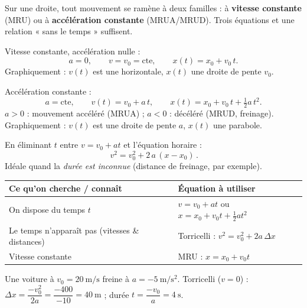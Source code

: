 \documentclass[11pt,a4paper]{article}
\begin{document}

\noindent Sur une droite, tout mouvement se ramène à deux familles : à \textbf{vitesse constante}
(MRU) ou à \textbf{accélération constante} (MRUA/MRUD). Trois équations et une relation « sans le temps » suffisent.

\begin{cle}
Vitesse constante, accélération nulle :
\[ a=0,\qquad v=v_0=\text{cte},\qquad x(t)=x_0+v_0\,t. \]
Graphiquement : $v(t)$ est une horizontale, $x(t)$ une droite de pente $v_0$.
\end{cle}

\begin{cle}
Accélération constante :
\[ a=\text{cte},\qquad v(t)=v_0+a\,t,\qquad x(t)=x_0+v_0\,t+\tfrac12 a\,t^2. \]
$a>0$ : mouvement accéléré (MRUA) ; $a<0$ : décéléré (MRUD, freinage).
Graphiquement : $v(t)$ est une droite de pente $a$, $x(t)$ une parabole.
\end{cle}

\begin{cle}
En éliminant $t$ entre $v=v_0+at$ et l'équation horaire :
\[ \boxed{\,v^2=v_0^2+2\,a\,(x-x_0)\,}. \]
Idéale quand la \emph{durée est inconnue} (distance de freinage, par exemple).
\end{cle}

\begin{methode}
\begin{center}\small
\begin{tabular}{@{}>{\raggedright\arraybackslash}p{5.4cm}|>{\raggedright\arraybackslash}p{8.6cm}@{}}
\toprule
\rowcolor{primary!12}\textbf{Ce qu'on cherche / connaît} & \textbf{Équation à utiliser} \\
\midrule
On dispose du temps $t$ & $v=v_0+at$ \quad ou \quad $x=x_0+v_0t+\tfrac12at^2$ \\
Le temps n'apparaît pas (vitesses \& distances) & Torricelli : $v^2=v_0^2+2a\,\Delta x$ \\
Vitesse constante & MRU : $x=x_0+v_0t$ \\
\bottomrule
\end{tabular}
\end{center}
\end{methode}

\begin{exemplebox}
Une voiture à $v_0=\qty{20}{\metre\per\second}$ freine à $a=\qty{-5}{\metre\per\second\squared}$.
Torricelli ($v=0$) : $\Delta x=\dfrac{-v_0^2}{2a}=\dfrac{-400}{-10}=\qty{40}{\metre}$ ; durée $t=\dfrac{-v_0}{a}=\qty{4}{\second}$.
\end{exemplebox}
\end{document}
